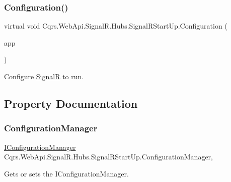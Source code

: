 \subsubsection{\texorpdfstring{Configuration()}{Configuration()}}
{\footnotesize\ttfamily virtual void Cqrs.\+Web\+Api.\+Signal\+R.\+Hubs.\+Signal\+R\+Start\+Up.\+Configuration (\begin{DoxyParamCaption}\item[{I\+App\+Builder}]{app }\end{DoxyParamCaption})\hspace{0.3cm}{\ttfamily [virtual]}}



Configure \hyperlink{namespaceCqrs_1_1WebApi_1_1SignalR}{SignalR} to run. 



\subsection{Property Documentation}
\mbox{\label{classCqrs_1_1WebApi_1_1SignalR_1_1Hubs_1_1SignalRStartUp_a0c137e0c86431dc944d7a3415de011bb_a0c137e0c86431dc944d7a3415de011bb}} 
\subsubsection{\texorpdfstring{Configuration\+Manager}{ConfigurationManager}}
{\footnotesize\ttfamily \hyperlink{interfaceCqrs_1_1Configuration_1_1IConfigurationManager}{I\+Configuration\+Manager} Cqrs.\+Web\+Api.\+Signal\+R.\+Hubs.\+Signal\+R\+Start\+Up.\+Configuration\+Manager\hspace{0.3cm}{\ttfamily [get]}, {\ttfamily [set]}}



Gets or sets the I\+Configuration\+Manager. 

